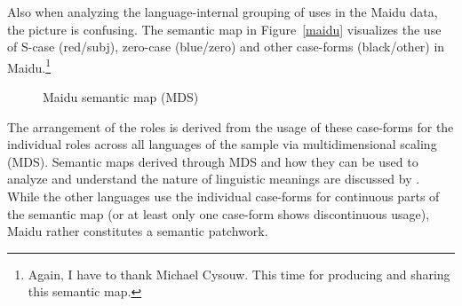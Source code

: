 Also when analyzing the language-internal grouping of uses in the Maidu data, the picture is confusing. 
The semantic map in Figure~\vref{maidu} visualizes the use of S-case (red/subj), zero-case
(blue/zero) and other case-forms (black/other) in Maidu.\footnote{Again, I have to thank
  Michael Cysouw. This time for producing and sharing this semantic map.}  
\begin{figure}[h,t,b] \centering {}%
\caption{Maidu semantic map (MDS)}\label{maidu}
\end{figure}
The arrangement of the roles is derived from the usage of these case-forms for the individual roles across all languages of the sample via multidimensional scaling (MDS). 
Semantic maps derived through MDS and how they can be used to analyze and understand the nature of linguistic meanings are discussed by \citet{Cysouw:2010}.
While the other languages use the individual case-forms for continuous parts of the semantic map (or at least only one case-form shows discontinuous usage), Maidu rather constitutes a semantic patchwork.  

